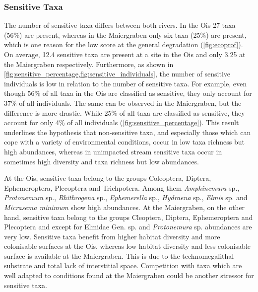 \subsubsection{Sensitive Taxa}\label{sec:sensitive_taxa_discussion}          %

The number of sensitive taxa differs between both rivers. In the Ois 27 taxa (56\%) are present, whereas in the Maiergraben only six taxa (25\%) are present, which is one reason for the low score at the general degradation (\cref{fig:ecoprof}). On average, 12.4 sensitive taxa are present at a site in the Ois and only 3.25 at the Maiergraben respectively. Furthermore, as shown in \cref{fig:sensitive_percentage,fig:sensitive_individuals}, the number of sensitive individuals is low in relation to the number of sensitive taxa. For example, even though 56\% of all taxa in the Ois are classified as sensitive, they only account for 37\% of all individuals. The same can be observed in the Maiergraben, but the difference is more drastic. While 25\% of all taxa are classified as sensitive, they account for only 4\% of all individuals (\cref{fig:sensitive_percentage}). This result underlines the hypothesis that non-sensitive taxa, and especially those which can cope with a variety of environmental conditions, occur in low taxa richness but high abundances, whereas in unimpacted stream sensitive taxa occur in sometimes high diversity and taxa richness but low abundances.


At the Ois, sensitive taxa belong to the groups Coleoptera, Diptera, Ephemeroptera, Plecoptera and Trichpotera. Among them \emph{Amphinemura} sp., \emph{Protonemura} sp., \emph{Rhithrogena} sp., \emph{Ephemerella} sp., \emph{Hydraena} sp., \emph{Elmis} sp. and \emph{Micrasema minimum} show high abundances. At the Maiergraben, on the other hand, sensitive taxa belong to the groups Cleoptera, Diptera, Ephemeroptera and Plecoptera and except for Elmidae Gen. sp. and \emph{Protonemura} sp. abundances are very low. Sensitive taxa benefit from higher habitat diversity and more colonisable surfaces at the Ois, whereas low habitat diversity and less colonisable surface is available at the Maiergraben. This is due to the technomegalithal substrate and total lack of interstitial space. Competition with taxa which are well adapted to conditions found at the Maiergraben could be another stressor for sensitive taxa.


